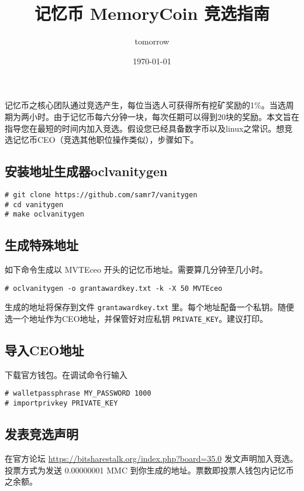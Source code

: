 \documentclass[a4paper,10pt]{article}
\begin{document}
\begin{CJK}{UTF8}{gbsn} 

\title{记忆币 MemoryCoin 竞选指南}
\author{tomorrow}
\date{\today}
\maketitle

记忆币之核心团队通过竞选产生，每位当选人可获得所有挖矿奖励的1\%。当选周期为两小时。由于记忆币每六分钟一块，每次任期可以得到20块的奖励。本文旨在指导您在最短的时间内加入竞选。假设您已经具备数字币以及linux之常识。想竞选记忆币CEO（竞选其他职位操作类似），步骤如下。

\subsection*{安装地址生成器oclvanitygen}

\begin{verbatim}
# git clone https://github.com/samr7/vanitygen
# cd vanitygen
# make oclvanitygen
\end{verbatim}

\subsection*{生成特殊地址}

如下命令生成以 MVTEceo 开头的记忆币地址。需要算几分钟至几小时。
\begin{verbatim}
# oclvanitygen -o grantawardkey.txt -k -X 50 MVTEceo
\end{verbatim}
生成的地址将保存到文件 \verb+grantawardkey.txt+ 里。每个地址配备一个私钥。随便选一个地址作为CEO地址，并保管好对应私钥 \verb+PRIVATE_KEY+。建议打印。

\subsection*{导入CEO地址}
下载官方钱包。在调试命令行输入
\begin{verbatim}
# walletpassphrase MY_PASSWORD 1000
# importprivkey PRIVATE_KEY
\end{verbatim}

\subsection*{发表竞选声明}
在官方论坛
\url{https://bitsharestalk.org/index.php?board=35.0}
发文声明加入竞选。投票方式为发送 0.00000001 MMC
到你生成的地址。票数即投票人钱包内记忆币之余额。

\end{CJK}
\end{document}

